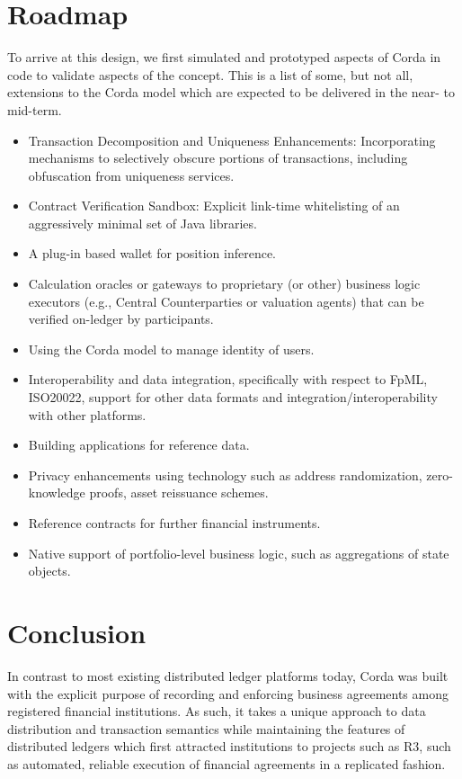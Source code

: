 \documentclass{article}
\begin{document}
\section{Roadmap}
To arrive at this design, we first simulated and prototyped aspects of Corda in code to validate aspects of the concept. This is a list of some, but not all, extensions to the Corda model which are expected to be delivered in the near- to mid-term.
\begin{itemize}	
\item Transaction Decomposition and Uniqueness Enhancements: Incorporating mechanisms to selectively obscure portions of transactions, including obfuscation from uniqueness services.
\item Contract Verification Sandbox: Explicit link-time whitelisting of an aggressively minimal set of Java libraries.
\item A plug-in based wallet for position inference.
\item Calculation oracles or gateways to proprietary (or other) business logic executors (e.g., Central Counterparties or valuation agents) that can be verified on-ledger by participants.
\item	Using the Corda model to manage identity of users.
\item Interoperability and data integration, specifically with respect to FpML, ISO20022, support for other data formats and integration/interoperability with other platforms.
\item	Building applications for reference data.
\item	Privacy enhancements using technology such as address randomization, zero-knowledge proofs, asset reissuance schemes.
\item	Reference contracts for further financial instruments.
\item Native support of portfolio-level  business logic, such as aggregations of state objects.
\end{itemize}
\section{Conclusion}
In contrast to most existing distributed ledger platforms today, Corda was built with the explicit purpose of recording and enforcing business agreements among registered financial institutions. As such, it takes a unique approach to data distribution and transaction semantics while maintaining the features of distributed ledgers which first attracted institutions to projects such as R3, such as automated, reliable execution of financial agreements in a replicated fashion.


\end{document}

